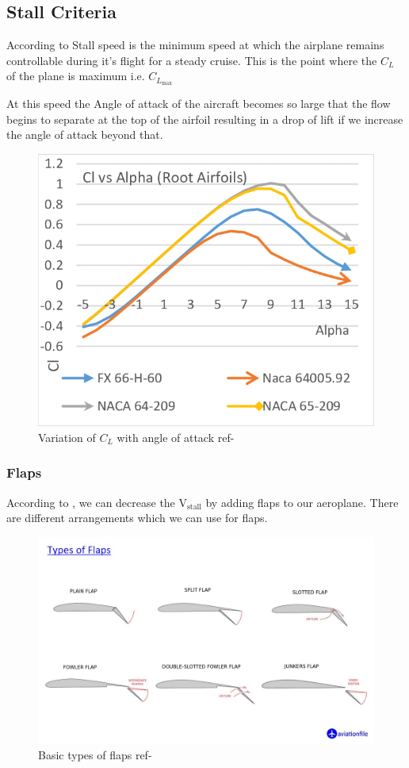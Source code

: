 \documentclass[12 pt]{article}
\begin{document}
\subsection{Stall Criteria}
According to \cite{stall1} Stall speed is the minimum speed at which the airplane remains controllable during it's flight for a steady cruise. This is the point where the $C_L$ of the plane is maximum i.e. $C_{L_{\text{max}}}$

At this speed the Angle of attack of the aircraft becomes so large that the flow begins to separate at the top of the airfoil resulting in a drop of lift if we increase the angle of attack beyond that.

\begin{figure}[h]
    \centering
    \includegraphics[width=0.4\linewidth]{Extra pics/Cllvsalpha.png}
    \caption{Variation of $C_L$ with angle of attack ref- \cite{stallpic}}
    \label{Variation of $C_L$ with angle}
\end{figure}



\subsubsection{Flaps}
According to \cite{flap}, we can decrease the $\text{V}_\text{stall}$ by adding flaps to our aeroplane. There are different arrangements which we can use for flaps.

\begin{figure}
    \centering
    \includegraphics[width=0.5\linewidth]{Extra pics/flap-types.jpg}
    \caption{Basic types of flaps ref- \cite{flap} }
    \label{Different Flap types}
\end{figure}
\end{document}
